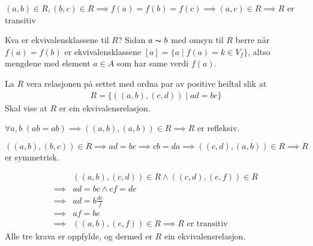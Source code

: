 \documentclass[a4paper, 11pt]{article}
\newcommand{\Themecolor}{Mahogany} %
\newcommand{\Themetext}[1]{\textcolor{\Themecolor}{#1}}
\newcommand{\Task}[1]{\vspace{3mm}\noindent {\tt \Themetext{#1:}}}
\newcommand{\MajorTask}[1]{
  \vspace{5mm}
  \reversemarginpar
  \marginnote{\large\bfseries \Themetext{#1}}
}
\begin{document}
 \((a,b) \in R, (b,c) \in R \implies f(a) = f(b) = f(c)
\implies (a,c) \in R \implies R\) er transitiv


\Task{b} Kva er ekvivalensklassene til \(R\)?
\noindent Sidan \(a \thicksim b\) med omsyn til \(R\) berre når \(f(a) = f(b)\) er
ekvivalensklassene \([a] = \{a \mid f(a) = k \in V_f\}\), altso mengdene med element
\( a\in A\) som har same verdi \(f(a)\).


\MajorTask{16}
\noindent La \(R\) vera relasjonen på settet med ordna par av positive heiltal slik at
\begin{align*}
  R = \{((a,b),(c,d)) \mid ad = bc\}
\end{align*}
Skal vise at \(R\) er ein ekvivalensrelasjon.

 \(\forall a,b \; (ab = ab) \implies ((a,b),(a,b)) \in R
\implies R\) er refleksiv.

 \(((a,b), (b,c)) \in R \implies ad=bc \implies cb=da
\implies ((c,d),(a,b)) \in R \implies R\) er symmetrisk.

\begin{align*}
  &((a,b), (c,d)) \in R \land ((c,d), (e,f)) \in R \\
  \implies& ad = bc \land cf = de \\
  \implies& ad = b\frac{de}{f} \\
  \implies& af = be \\
  \implies& ((a,b),(e,f)) \in R \implies R \text{ er transitiv}
\end{align*}
Alle tre krava er oppfylde, og dermed er \(R\) ein ekvivalensrelasjon.
\end{document}
